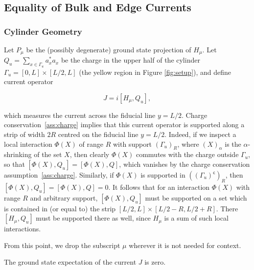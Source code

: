 \documentclass[12pt, letterpaper]{article}
\begin{document}
\subsection{Equality of Bulk and Edge Currents}

\subsubsection{Cylinder Geometry}

Let $P_\mu$ be the (possibly degenerate) ground state projection of $H_\mu$. Let $Q_u = \sum_{x \in \Gamma_u} a_x^* a_x$ be the charge in the upper half of the cylinder $\Gamma_u = [0,L] \times [L/2,L]$ (the yellow region in Figure \ref{fig:setup}), and define current operator 

\[J = i[H_\mu,Q_u],\]

which measures the current across the fiducial line $y=L/2$. Charge conservation~\ref{ass:charge} implies that this current operator is supported along a strip of width $2R$ centred on the fiducial line $y=L/2$. Indeed, if we inspect a local interaction $\Phi(X)$ of range $R$ with support $(\Gamma_u)_R$, where $(X)_\alpha$ is the $\alpha$-shrinking of the set $X$, then clearly $\Phi(X)$ commutes with the charge outside $\Gamma_u$, so that $[\Phi(X), Q_u] = [\Phi(X), Q]$, which vanishes by the charge conservation assumption~\ref{ass:charge}. Similarly, if $\Phi(X)$ is supported in $((\Gamma_u)^\mathsf{c})_R$, then $[\Phi(X), Q_u] = [\Phi(X), Q] = 0$. It follows that for an interaction $\Phi(X)$ with range $R$ and arbitrary support, $[\Phi(X), Q_u]$ must be supported on a set which is contained in (or equal to) the strip $[L/2, L] \times [L/2-R, L/2+R]$. There $[H_\mu,Q_u]$ must be supported there as well, since $H_\mu$ is a sum of such local interactions. 

From this point, we drop the subscript $\mu$ wherever it is not needed for context.



\begin{lemma}
The ground state expectation of the current $J$ is zero.
\label{lemma:J=0}
\end{lemma}
\end{document}
